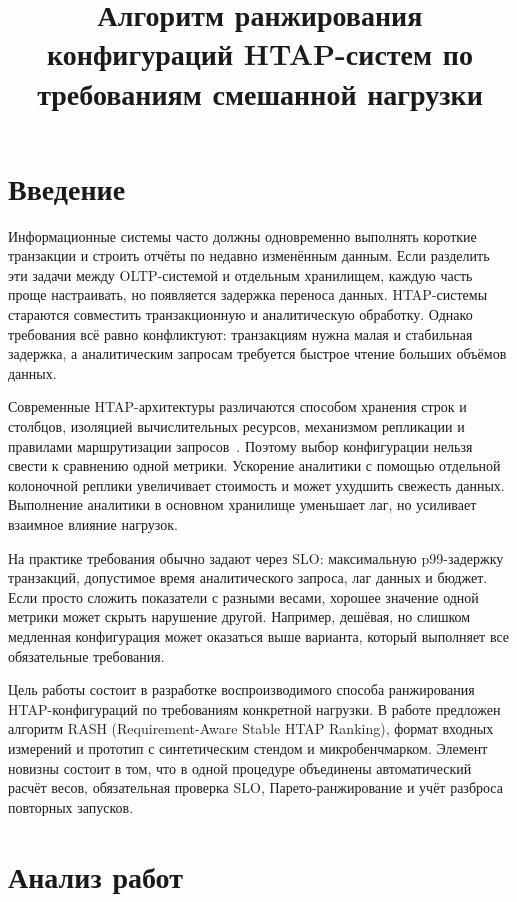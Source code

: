 \documentclass{misisarticle}
\title{Алгоритм ранжирования конфигураций HTAP-систем по требованиям смешанной нагрузки}
\begin{document}
\maketitle

\section{Введение}

	Информационные системы часто должны одновременно выполнять короткие транзакции и строить отчёты по недавно изменённым данным. Если разделить эти задачи между OLTP-системой и отдельным хранилищем, каждую часть проще настраивать, но появляется задержка переноса данных. HTAP-системы стараются совместить транзакционную и аналитическую обработку. Однако требования всё равно конфликтуют: транзакциям нужна малая и стабильная задержка, а аналитическим запросам требуется быстрое чтение больших объёмов данных.

	Современные HTAP-архитектуры различаются способом хранения строк и столбцов, изоляцией вычислительных ресурсов, механизмом репликации и правилами маршрутизации запросов~\cite{zhangSurvey2024}. Поэтому выбор конфигурации нельзя свести к сравнению одной метрики. Ускорение аналитики с помощью отдельной колоночной реплики увеличивает стоимость и может ухудшить свежесть данных. Выполнение аналитики в основном хранилище уменьшает лаг, но усиливает взаимное влияние нагрузок.

	На практике требования обычно задают через SLO: максимальную p99-задержку транзакций, допустимое время аналитического запроса, лаг данных и бюджет. Если просто сложить показатели с разными весами, хорошее значение одной метрики может скрыть нарушение другой. Например, дешёвая, но слишком медленная конфигурация может оказаться выше варианта, который выполняет все обязательные требования.

	Цель работы состоит в разработке воспроизводимого способа ранжирования HTAP-конфигураций по требованиям конкретной нагрузки. В работе предложен алгоритм RASH (Requirement-Aware Stable HTAP Ranking), формат входных измерений и прототип с синтетическим стендом и микробенчмарком. Элемент новизны состоит в том, что в одной процедуре объединены автоматический расчёт весов, обязательная проверка SLO, Парето-ранжирование и учёт разброса повторных запусков.

\section{Анализ работ}
\end{document}
